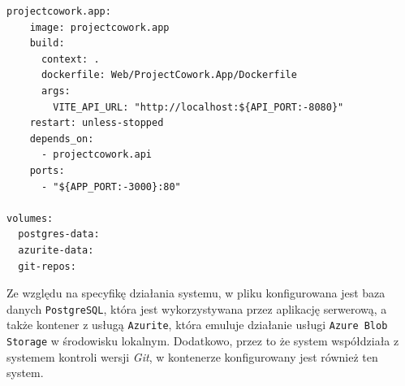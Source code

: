 \begin{lstlisting}[basicstyle=\footnotesize\ttfamily, captionpos=t, caption={Plik \texttt{compose.yaml} uruchamiający system}, label={lst:compose}]
  projectcowork.app:
    image: projectcowork.app
    build:
      context: .
      dockerfile: Web/ProjectCowork.App/Dockerfile
      args:
        VITE_API_URL: "http://localhost:${API_PORT:-8080}"
    restart: unless-stopped
    depends_on:
      - projectcowork.api
    ports:
      - "${APP_PORT:-3000}:80"

volumes:
  postgres-data:
  azurite-data:
  git-repos:
\end{lstlisting}
Ze względu na specyfikę działania systemu, w pliku konfigurowana jest baza danych \texttt{PostgreSQL}, która jest wykorzystywana przez aplikację serwerową, a także kontener z usługą \texttt{Azurite}, która emuluje działanie usługi \texttt{Azure Blob Storage} w środowisku lokalnym.
Dodatkowo, przez to że system współdziała z systemem kontroli wersji \textit{Git}, w kontenerze konfigurowany jest również ten system.